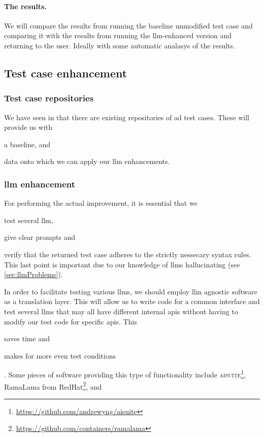 \paragraph{The results.} We will compare the results from running
the baseline unmodified test case and comparing it with the results from
running the \acrshort{llm}-enhanced version and returning to the user. Ideally with
some automatic analasys of the results.

\subsection{Test case enhancement}

\subsubsection{Test case repositories}

We have seen in  that there are existing repositories of
\acrshort{ad} test cases. These will provide us with \begin{inparaenum}
    \item a baseline,
    and
    \item data onto which we can apply our \acrshort{llm} enhancements.
\end{inparaenum}

\subsubsection{\acrshort{llm} enhancement}\label{sec:llmEnhancement}

For performing the actual improvement, it is essential that we \begin{inparaenum}
    \item test several \acrshort{llm},
    \item give clear prompts
    and
    \item verify that the returned test case adheres to the strictly nessecary
    syntax rules. This last point is important due to our knowledge of
    \acrshort{llms} hallucinating (see \cref{sec:llmProblems}).
\end{inparaenum}

In order to facilitate testing various \acrlong{llms}, we should employ
\acrshort{llm} agnostic software as a translation layer. This will allow us to
write code for a common interface and test several \acrshort{llms} that may all
have different internal \acrfull{apis} without having to modify our test code
for specific \acrshort{apis}. This \begin{inparaenum}
    \item saves time
    and
    \item makes for more even test conditions
\end{inparaenum}.
Some pieces of software providing this type of functionality include
\textsc{aisuite}\footnote{\url{https://github.com/andrewyng/aisuite}}, RamaLama
from RedHat\footnote{\url{https://github.com/containers/ramalama}}, and

